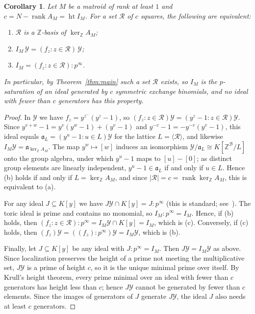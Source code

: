 \documentclass[11pt,a4paper]{article}
\theoremstyle{plain}
\newtheorem{corollary}[theorem]{Corollary}
\theoremstyle{definition}
\newcommand{\Z}{\mathbb Z}
\newcommand{\AM}{A_M}
\newcommand{\kerZ}{\ker_{\Z}\!A_M}
\newcommand{\bs}{\mathcal B}
\newcommand{\rank}{\operatorname{rank}}
\begin{document}
\begin{corollary}\label{cor:toric}
Let $M$ be a matroid of rank at least $1$ and $c=N-\rank\AM=\operatorname{ht}I_M$. For a set $\mathcal R$ of $c$ squares, the following are equivalent:
\begin{enumerate}[label=(\alph*),itemsep=1pt]
\item $\mathcal R$ is a $\Z$-basis of $\kerZ$;
\item $I_M\,\mathcal Y=(f_z:z\in\mathcal R)\,\mathcal Y$;
\item $I_M=(f_z:z\in\mathcal R):p^{\infty}$.
\end{enumerate}
In particular, by Theorem~\ref{thm:main} such a set $\mathcal R$ exists, so $I_M$ is the $p$-saturation of an ideal generated by $c$ symmetric exchange binomials, and no ideal with fewer than $c$ generators has this property.
\end{corollary}
\begin{proof}
In $\mathcal Y$ we have $f_z=y^{z^-}(y^z-1)$, so $(f_z:z\in\mathcal R)\mathcal Y=(y^z-1:z\in\mathcal R)\mathcal Y$. Since $y^{v+w}-1=y^v(y^w-1)+(y^v-1)$ and $y^{-v}-1=-y^{-v}(y^v-1)$, this ideal equals $\mathfrak a_L=(y^u-1:u\in L)\mathcal Y$ for the lattice $L=\langle\mathcal R\rangle$, and likewise $I_M\mathcal Y=\mathfrak a_{\kerZ}$. The map $y^w\mapsto[w]$ induces an isomorphism $\mathcal Y/\mathfrak a_L\cong K[\Z^{\bs}/L]$ onto the group algebra, under which $y^u-1$ maps to $[u]-[0]$; as distinct group elements are linearly independent, $y^u-1\in\mathfrak a_L$ if and only if $u\in L$. Hence (b) holds if and only if $L=\kerZ$, and since $|\mathcal R|=c=\rank\kerZ$, this is equivalent to (a).

For any ideal $J\subseteq K[y]$ we have $J\mathcal Y\cap K[y]=J:p^{\infty}$ (this is standard; see~\cite{ES96}). The toric ideal is prime and contains no monomial, so $I_M:p^\infty=I_M$. Hence, if (b) holds, then $(f_z:z\in\mathcal R):p^\infty=I_M\mathcal Y\cap K[y]=I_M$, which is (c). Conversely, if (c) holds, then $(f_z)\mathcal Y=((f_z):p^\infty)\mathcal Y=I_M\mathcal Y$, which is (b).

Finally, let $J\subseteq K[y]$ be any ideal with $J:p^\infty=I_M$. Then $J\mathcal Y=I_M\mathcal Y$ as above. Since localization preserves the height of a prime not meeting the multiplicative set, $J\mathcal Y$ is a prime of height $c$, so it is the unique minimal prime over itself. By Krull's height theorem, every prime minimal over an ideal with fewer than $c$ generators has height less than $c$; hence $J\mathcal Y$ cannot be generated by fewer than $c$ elements. Since the images of generators of $J$ generate $J\mathcal Y$, the ideal $J$ also needs at least $c$ generators.
\end{proof}
\end{document}
